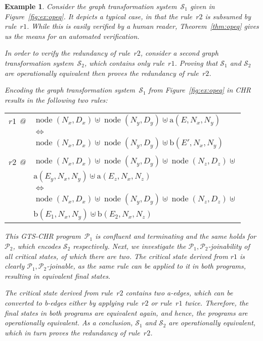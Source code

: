 \documentclass{tlp}
\newtheorem{example}{Example}[section]
\newcommand{\mcP}{\ensuremath{\mathcal{P}}}
\newcommand{\mcS}{\ensuremath{\mathcal{S}}}
\newcommand{\Ps}{\ensuremath{\mcP_1,\mcP_2}}
\DeclareMathOperator{\node}{node}
\begin{document}
\begin{example}

Consider the graph transformation system~$\mcS_1$ given in
Figure~\ref{fig:ex:opeq}. It depicts a typical case, in that the rule~$r2$ is
subsumed by rule~$r1$. While this is easily verified by a human reader,
Theorem~\ref{thm:opeq} gives us the means for an automated verification.

In order to verify the redundancy of rule~$r2$, consider a second graph
transformation system~$\mcS_2$, which contains only rule~$r1$. Proving that
$\mcS_1$ and $\mcS_2$ are operationally equivalent then proves the redundancy of
rule~$r2$.

Encoding the graph transformation system~$\mcS_1$ from Figure~\ref{fig:ex:opeq}
in CHR results in the following two rules:\\
\begin{tabular}{ll}
$r1$ @ & $\node(N_x, D_x) \uplus \node(N_y, D_y) \uplus \text{a}(E, N_x, N_y)$
\\
& $\Leftrightarrow$ \\
& $\node(N_x, D_x) \uplus \node(N_y, D_y) \uplus \text{b}(E', N_x, N_y)$\\
\\
$r2$ @ & $\node(N_x, D_x) \uplus \node(N_y, D_y) \uplus \node(N_z, D_z)
\uplus$\\
& $\text{a}(E_y, N_x, N_y) \uplus \text{a}(E_z, N_x, N_z)$ \\
& $\Leftrightarrow$ \\
& $\node(N_x, D_x) \uplus \node(N_y, D_y) \uplus \node(N_z, D_z) \uplus$\\
& $\text{b}(E_1, N_x, N_y) \uplus \text{b}(E_2, N_x, N_z)$
\end{tabular}

This GTS-CHR program~$\mcP_1$ is confluent and terminating and the same holds for
$\mcP_2$, which encodes $\mcS_2$ respectively. Next, we investigate the
$\Ps$-joinability of all critical states, of which there are two. The critical
state derived from $r1$ is clearly $\Ps$-joinable, as the same rule can be
applied to it in both programs, resulting in equivalent final states.

The critical state derived from rule~$r2$ contains two a-edges, which can be
converted to b-edges either by applying rule~$r2$ or rule~$r1$ twice. Therefore,
the final states in both programs are equivalent again, and hence, the programs
are operationally equivalent. As a conclusion, $\mcS_1$ and $\mcS_2$ are
operationally equivalent, which in turn proves the redundancy of rule~$r2$.

\end{example}
\end{document}
